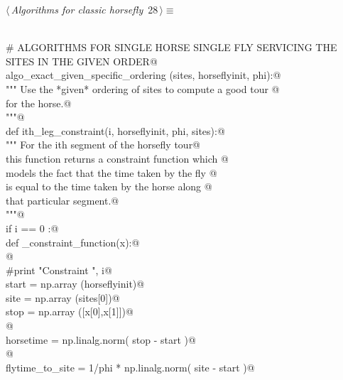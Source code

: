 \documentclass[11.5pt]{report}
\begin{document}
\begin{flushleft} \small\label{scrap21}\raggedright\small
{} $\langle\,${\itshape Algorithms for classic horsefly}\nobreak\ {\footnotesize {28}}$\,\rangle\equiv$
\vspace{-1ex}
\begin{list}{}{} \item
\mbox{}\verb@@\\
\mbox{}\verb@# ALGORITHMS FOR SINGLE HORSE SINGLE FLY SERVICING THE SITES IN THE GIVEN ORDER@\\
\mbox{}\verb@def algo_exact_given_specific_ordering (sites, horseflyinit, phi):@\\
\mbox{}\verb@    """ Use the *given* ordering of sites to compute a good tour @\\
\mbox{}\verb@    for the horse.@\\
\mbox{}\verb@    """@\\
\mbox{}\verb@    def ith_leg_constraint(i, horseflyinit, phi, sites):@\\
\mbox{}\verb@        """ For the ith segment of the horsefly tour@\\
\mbox{}\verb@        this function returns a constraint function which @\\
\mbox{}\verb@        models the fact that the time taken by the fly @\\
\mbox{}\verb@        is equal to the time taken by the horse along @\\
\mbox{}\verb@        that particular segment.@\\
\mbox{}\verb@        """@\\
\mbox{}\verb@        if i == 0 :@\\
\mbox{}\verb@            def _constraint_function(x):@\\
\mbox{}\verb@            @\\
\mbox{}\verb@                #print "Constraint  ", i@\\
\mbox{}\verb@                start = np.array (horseflyinit)@\\
\mbox{}\verb@                site  = np.array (sites[0])@\\
\mbox{}\verb@                stop  = np.array ([x[0],x[1]])@\\
\mbox{}\verb@            @\\
\mbox{}\verb@                horsetime = np.linalg.norm( stop - start )@\\
\mbox{}\verb@            @\\
\mbox{}\verb@                flytime_to_site   = 1/phi * np.linalg.norm( site - start )@\\

\end{list}
\end{flushleft}
\end{document}
